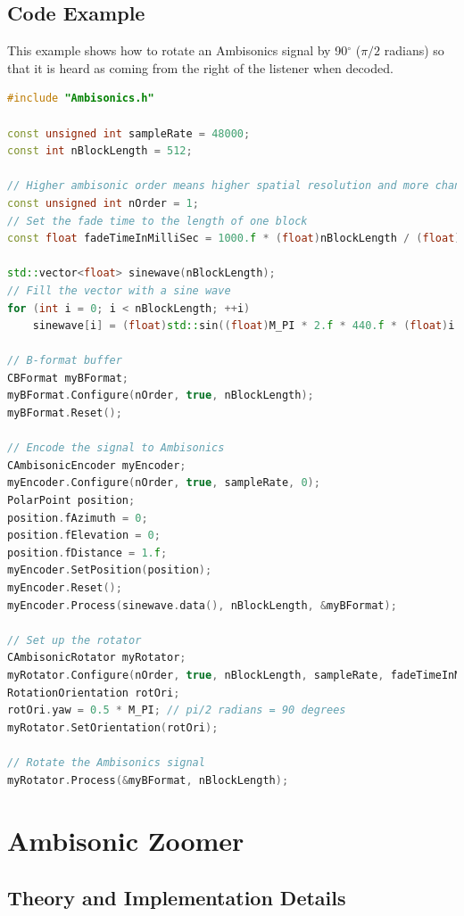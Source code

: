 \documentclass[12pt]{report}
\def\deg{$^{\circ}$ }
\begin{document}
\subsection{Code Example}

This example shows how to rotate an Ambisonics signal by 90\deg ($\pi/2$ radians) so that it is heard as coming from the right of the listener when decoded.

\begin{lstlisting}[language=C++]
#include "Ambisonics.h"

const unsigned int sampleRate = 48000;
const int nBlockLength = 512;

// Higher ambisonic order means higher spatial resolution and more channels required
const unsigned int nOrder = 1;
// Set the fade time to the length of one block
const float fadeTimeInMilliSec = 1000.f * (float)nBlockLength / (float)sampleRate;

std::vector<float> sinewave(nBlockLength);
// Fill the vector with a sine wave
for (int i = 0; i < nBlockLength; ++i)
    sinewave[i] = (float)std::sin((float)M_PI * 2.f * 440.f * (float)i / (float)sampleRate);

// B-format buffer
CBFormat myBFormat;
myBFormat.Configure(nOrder, true, nBlockLength);
myBFormat.Reset();

// Encode the signal to Ambisonics
CAmbisonicEncoder myEncoder;
myEncoder.Configure(nOrder, true, sampleRate, 0);
PolarPoint position;
position.fAzimuth = 0;
position.fElevation = 0;
position.fDistance = 1.f;
myEncoder.SetPosition(position);
myEncoder.Reset();
myEncoder.Process(sinewave.data(), nBlockLength, &myBFormat);

// Set up the rotator
CAmbisonicRotator myRotator;
myRotator.Configure(nOrder, true, nBlockLength, sampleRate, fadeTimeInMilliSec);
RotationOrientation rotOri;
rotOri.yaw = 0.5 * M_PI; // pi/2 radians = 90 degrees
myRotator.SetOrientation(rotOri);

// Rotate the Ambisonics signal
myRotator.Process(&myBFormat, nBlockLength);
\end{lstlisting}

\section{Ambisonic Zoomer}\label{AmbiZoomer}
\subsection{Theory and Implementation Details}
\end{document}
